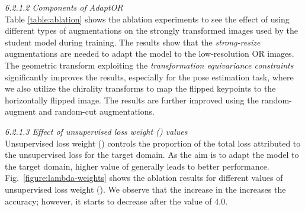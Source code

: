 \emph{6.2.1.2 Components of AdaptOR}\\
Table \ref{table:ablation} shows the ablation experiments to see the effect of using different types of augmentations on the strongly transformed images used by the student model during training. The results show that the \emph{strong-resize} augmentations are needed to adapt the model to the low-resolution OR images. The geometric transform exploiting the \emph{transformation equivariance constraints} significantly improves the results, especially for the pose estimation task, where we also utilize the chirality transforms to map the flipped keypoints to the horizontally flipped image. The results are further improved using the random-augment and random-cut augmentations.

{\blue \emph{6.2.1.3 Effect of unsupervised loss weight () values}\\
Unsupervised loss weight () controls the proportion of the total loss attributed to the unsupervised loss for the target domain. As the aim is to adapt the model to the target domain, higher value of  generally leads to better performance. Fig.~\ref{figure:lambda-weights} shows the ablation results for different values of unsupervised loss weight (). We observe that the increase in the  increases the accuracy; however, it starts to decrease after the  value of 4.0.}

